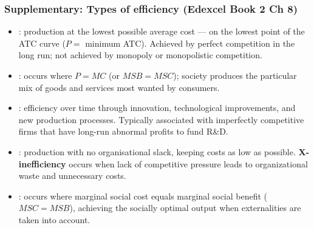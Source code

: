 \subsubsection*{Supplementary: Types of efficiency (Edexcel Book 2 Ch 8)}
\begin{itemize}
  \item {}: production at the lowest possible average cost --- on the lowest point of the ATC curve ($P = $ minimum ATC). Achieved by perfect competition in the long run; not achieved by monopoly or monopolistic competition.
  \item {}: occurs where $P = MC$ (or $MSB = MSC$); society produces the particular mix of goods and services most wanted by consumers.
  \item {}: efficiency over time through innovation, technological improvements, and new production processes. Typically associated with imperfectly competitive firms that have long-run abnormal profits to fund R\&D.
  \item {}: production with no organisational slack, keeping costs as low as possible. \textbf{X-inefficiency} occurs when lack of competitive pressure leads to organizational waste and unnecessary costs.
  \item {}: occurs where marginal social cost equals marginal social benefit ($MSC = MSB$), achieving the socially optimal output when externalities are taken into account.
\end{itemize}
